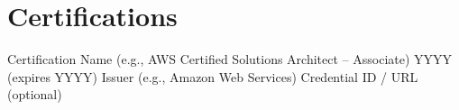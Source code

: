 
\section{Certifications}

\resumeSubHeadingListStart
    \resumeSubheading
        {Certification Name (e.g., AWS Certified Solutions Architect -- Associate)}
        {YYYY (expires YYYY)}
        {Issuer (e.g., Amazon Web Services)}
        {Credential ID / URL (optional)}
\resumeSubHeadingListEnd
